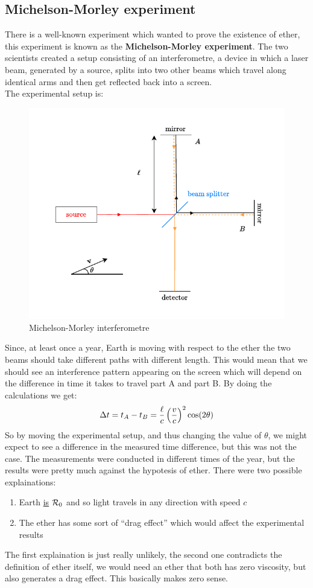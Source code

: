 \subsection{Michelson-Morley experiment}
There is a well-known experiment which wanted to prove the existence of ether, this experiment is known as the \textbf{Michelson-Morley experiment}. The two scientists created a setup consisting of an interferometre, a device in which a laser beam, generated by a source, splits into two other beams which travel along identical arms and then get reflected back into a screen.\\
The experimental setup is:
\begin{figure}[H]
  \centering
  \includegraphics[width=0.6\linewidth]{res/svg/michelson_morley_experiment.drawio}
  \caption{Michelson-Morley interferometre}
\end{figure}
Since, at least once a year, Earth is moving with respect to the ether the two beams should take different paths with different length. This would mean that we should see an interference pattern appearing on the screen which will depend on the difference in time it takes to travel part A and part B. By doing the calculations we get:
\begin{equation}
  \Delta t = t_A - t_B = \dfrac{\ell}{c}\left(\dfrac{v}{c}\right)^2\cos(2\theta)
\end{equation}
So by moving the experimental setup, and thus changing the value of $\theta$, we might expect to see a difference in the measured time difference, but this was not the case. The measurements were conducted in different times of the year, but the results were pretty much against the hypotesis of ether. There were two possible explainations:
\begin{enumerate}
  \item Earth \underline{is} $\mathcal{R}_0$ and so light travels in any direction with speed $c$
  \item The ether has some sort of ``drag effect'' which would affect the experimental results
\end{enumerate}
The first explaination is just really unlikely, the second one contradicts the definition of ether itself, we would need an ether that both has zero viscosity, but also generates a drag effect. This basically makes zero sense.
